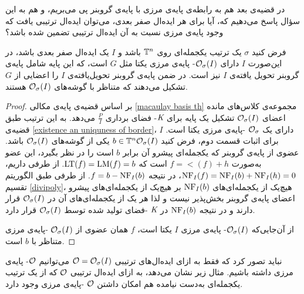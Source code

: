 در قضیه‌ی بعد هم به رابطه‌ی پایه‌ی مرزی با پایه‌ی گروبنر پی می‌بریم، و هم به این سؤال  پاسخ می‌دهیم که، آیا برای هر ایده‌ال صفر بعدی، می‌توان ایده‌ال ترتیبی یافت که وجود پایه‌ی مرزی نسبت به آن ایده‌ال ترتیبی تضمین شده باشد؟ 

\begin{theorem}
	\label{gb bb relation th}
فرض کنید 
$\sigma$
یک ترتیب یکجمله‌ای روی 
${\mathbb{T}}^{n}$
باشد و 
$I$
یک ایده‌ال صفر بعدی باشد، در این‌صورت 
$I$
دارای 
${\mathcal O}_{\sigma}(I)$-
پایه‌ی مرزی یکتا مثل
$G$
است، که این پایه‌ شامل پایه‌ی گروبنر تحویل یافته‌ی 
$I$
نیز است. در ضمن پایه‌ی گروبنر تحویل‌یافته‌ی 
$I$
را اعضایی از 
$G$
تشکیل می‌دهند که متناظر با گوشه‌های 
${\mathcal O}_{\sigma}(I)$
هستند. 
\end{theorem}
\begin{proof}
بر اساس قضیه‌ی پایه‌ی مکالی 
\ref{macaulay basis th}
مجموعه‌ی کلاس‌های مانده اعضای
${\mathcal O}_{\sigma}(I)$
تشکیل یک پایه برای 
$\textit{K}$-
فضای برداری 
$\frac{P}{I}$
می‌دهد. به این ترتیب طبق قضیه‌ی 
\ref{existence an uniquness of border}،
$I$
دارای یک 
${\mathcal O}_{\sigma}$
-پایه‌ی مرزی یکتا است. برای اثبات قسمت دوم، فرض کنید 
$b\in {\mathbb{T}}^{n}{\mathcal O}_{\sigma}(I)$
یکی از گوشه‌های 
${\mathcal O}_{\sigma}(I)$
باشد. عضوی از پایه‌ی گروبنر که یکجمله‌ای پیشرو آن برابر 
$b$
است را در نظر بگیرد، این عضو به‌صورت 
$f = \lt(f) + h$
است که 
$\operatorname{\mathrm{LT}}(f) = \operatorname{\mathrm{LM}}(f) = b$.
از طرفی داریم، 
$\operatorname{\mathrm{NF}}_{I}(f) = \operatorname{\mathrm{NF}}_{I}(b) + \operatorname{\mathrm{NF}}_{I}(h) = 0$،
در نتیجه 
$f = b - \operatorname{\mathrm{NF}}_{I}(b)$.
از طرفی طبق الگوریتم تقسیم
\ref{divipoly}،
هیچ‌یک از یکجمله‌ای‌های 
$\operatorname{\mathrm{NF}}_{I}(b)$
بر هیچ‌یک از یکجمله‌ای‌های پیشرو اعضای پایه‌ی گروبنر بخش‌پذیر نیست و لذا هر یک از یکجمله‌ای‌های آن در  
${\mathcal O}_{\sigma}(I)$
قرار دارند و در نتیجه 
$\operatorname{\mathrm{NF}}_{I}(b)$
در 
$\textit{K}$
-فضای تولید شده توسط 
${\mathcal O}_{\sigma}(I)$
قرار دارد. 

از آن‌جایی‌که 
${\mathcal O}_{\sigma}(I)$-
پایه‌ی مرزی 
$I$
یکتا است، 
$f$
همان عضوی از 
${\mathcal O}_{\sigma}(I)$
-پایه‌ی مرزی متناظر با 
$b$
است.
\end{proof}
 نباید تصور کرد که فقط به ازای ایده‌ال‌های ترتیبی  
${\mathcal O} = {\mathcal O}_{\sigma}(I)$
می‌توانیم 
${\mathcal O}$-
پایه‌ی مرزی داشته باشیم. مثال زیر نشان می‌دهد، به ازای ایده‌ال ترتیبی 
${\mathcal O}$
که از یک ترتیب یکجمله‌ای به‌دست  نیامده هم امکان داشتن
${\mathcal O}$
-پایه‌ی مرزی وجود دارد. 
